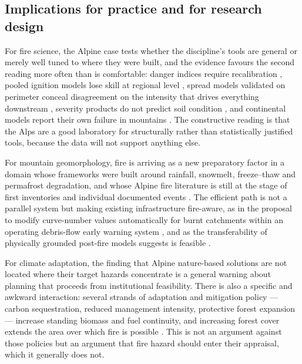 \documentclass[11pt,a4paper]{article}
\begin{document}
\subsection{Implications for practice and for research design}

For fire science, the Alpine case tests whether the discipline's tools are general or merely well tuned to where they were built, and the evidence favours the second reading more often than is comfortable: danger indices require recalibration \citep{de_angelis_modelling_2015, zacharakis_environmental_2023}, pooled ignition models lose skill at regional level \citep{gelabert_assessing_2025}, spread models validated on perimeter conceal disagreement on the intensity that drives everything downstream \citep{malanchini_modeling_2025}, severity products do not predict soil condition \citep{negri_wildfire_2026}, and continental models report their own failure in mountains \citep{forrest_understanding_2024}. The constructive reading is that the Alps are a good laboratory for structurally rather than statistically justified tools, because the data will not support anything else.

For mountain geomorphology, fire is arriving as a new preparatory factor in a domain whose frameworks were built around rainfall, snowmelt, freeze--thaw and permafrost degradation, and whose Alpine fire literature is still at the stage of first inventories \citep{melzner_wildfire-induced_2025} and individual documented events \citep{tiranti_wildfires_2021, laporta_postwildfire_2025, melzner_brief_2019}. The efficient path is not a parallel system but making existing infrastructure fire-aware, as in the proposal to modify curve-number values automatically for burnt catchments within an operating debris-flow early warning system \citep{tiranti_wildfires_2021}, and as the transferability of physically grounded post-fire models suggests is feasible \citep{diakakis_exploring_2023}.

For climate adaptation, the finding that Alpine nature-based solutions are not located where their target hazards concentrate \citep{dubo_nature-based_2023} is a general warning about planning that proceeds from institutional feasibility. There is also a specific and awkward interaction: several strands of adaptation and mitigation policy --- carbon sequestration, reduced management intensity, protective forest expansion --- increase standing biomass and fuel continuity, and increasing forest cover extends the area over which fire is possible \citep{gerberding_mapping_2025}. This is not an argument against those policies but an argument that fire hazard should enter their appraisal, which it generally does not.
\end{document}
